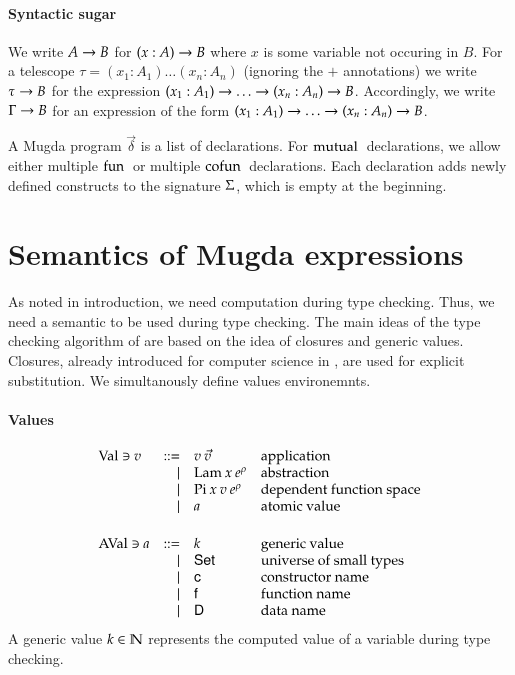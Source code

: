 \paragraph*{Syntactic sugar}
We write $A \rightarrow B$ for $( x : A ) \rightarrow{B}$ where $x$ is some variable not occuring in $B$.
For a telescope $\tau = (x_1 : A_1) \ldots (x_n : A_n)$ (ignoring the $+$ annotations) we write
$\tau \rightarrow B$ for the expression  $( x_1 : A_1 ) \rightarrow{\ldots \rightarrow( x_n : A_n ) \rightarrow{B}}$.
Accordingly, we write $\Gamma \rightarrow B$ for an expression of the form $( x_1 : A_1 ) \rightarrow{\ldots \rightarrow( x_n : A_n ) \rightarrow{B}}$.

A Mugda program $\vec{\delta}$ is a list of declarations.
For $\mathrm{mutual}\:$ declarations, we allow either multiple $\mathrm{fun}\:$ or multiple $\mathrm{cofun}\:$ declarations.
Each declaration adds newly defined constructs to the signature $\mathrm{\Sigma}$, which is empty at the beginning.

\section{Semantics of Mugda expressions}
As noted in introduction, we need computation during type checking.
Thus, we need a semantic to be used during type checking.
The main ideas of the type checking algorithm of \cite{coquand96algorithm} are based on the idea of closures and generic values.
Closures, already introduced for computer science in \cite{Landin63}, are used for explicit substitution.
We simultanously define values environemnts.
 
\paragraph{Values}
\[
\begin{array}{lrll}
\Val \ni v & ::= & v \: \vec{v} & \mbox{application}\\
& \mid & \vlam \: x \: \cl{e}{\rho} & \mbox{abstraction}\\
& \mid & \vpi \: x \: v \: \cl{e}{\rho} & \mbox{dependent function space}\\
& \mid & a & \mbox{atomic value}\\
\vs\\
\AVal \ni a & ::= & k & \mbox{generic value}\\
& \mid & \Set & \mbox{universe of small types} \\
& \mid & \cc & \mbox{constructor name}\\
& \mid & \ff & \mbox{function name}\\
& \mid & \DD & \mbox{data name}\\
\end{array}
\]
A generic value $k \in \mathbb{N}$ represents the computed value of a variable during type checking.

